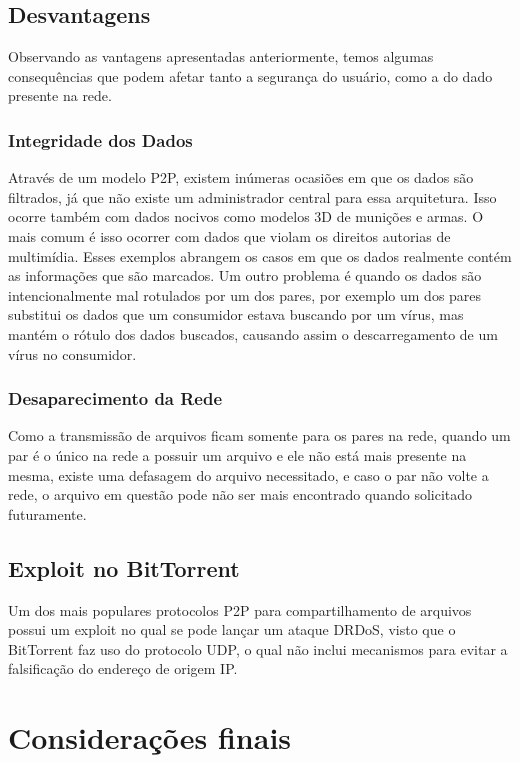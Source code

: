 \documentclass[a4paper]{article}
\begin{document}
\subsection{Desvantagens}
Observando as vantagens apresentadas anteriormente, temos algumas consequências que podem afetar tanto a segurança do usuário, como a do dado presente na rede.
\subsubsection{Integridade dos Dados}
Através de um modelo P2P, existem inúmeras ocasiões em que os dados são filtrados, já que não existe um administrador central para essa arquitetura. Isso ocorre também com dados nocivos como modelos 3D de munições e armas. O mais comum é isso ocorrer com dados que violam os direitos autorias de multimídia. Esses exemplos abrangem os casos em que os dados realmente contém as informações que são marcados. Um outro problema é quando os dados são intencionalmente mal rotulados por um dos pares, por exemplo um dos pares substitui os dados que um consumidor estava buscando por um vírus, mas mantém o rótulo dos dados buscados, causando assim o descarregamento de um vírus no consumidor.
\subsubsection{Desaparecimento da Rede}
Como a transmissão de arquivos ficam somente para os pares na rede, quando um par é o único na rede a possuir um arquivo e ele não está mais presente na mesma, existe uma defasagem do arquivo necessitado, e caso o par não volte a rede, o arquivo em questão pode não ser mais encontrado quando solicitado futuramente.
\subsection{Exploit no BitTorrent}
Um dos mais populares protocolos P2P para compartilhamento de arquivos possui um exploit no qual se pode lançar um ataque DRDoS, visto que o BitTorrent faz uso do protocolo UDP, o qual não inclui mecanismos para evitar a falsificação do endereço de origem IP.\cite{BitExploit}

\newpage

\section{Considerações finais}
\newpage


\newpage



\end{document}
